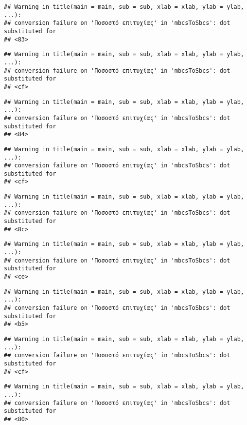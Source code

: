 \documentclass[
]{article}
\begin{document}
\begin{verbatim}
## Warning in title(main = main, sub = sub, xlab = xlab, ylab = ylab, ...):
## conversion failure on 'Ποσοστό επιτυχίας' in 'mbcsToSbcs': dot substituted for
## <83>
\end{verbatim}

\begin{verbatim}
## Warning in title(main = main, sub = sub, xlab = xlab, ylab = ylab, ...):
## conversion failure on 'Ποσοστό επιτυχίας' in 'mbcsToSbcs': dot substituted for
## <cf>
\end{verbatim}

\begin{verbatim}
## Warning in title(main = main, sub = sub, xlab = xlab, ylab = ylab, ...):
## conversion failure on 'Ποσοστό επιτυχίας' in 'mbcsToSbcs': dot substituted for
## <84>
\end{verbatim}

\begin{verbatim}
## Warning in title(main = main, sub = sub, xlab = xlab, ylab = ylab, ...):
## conversion failure on 'Ποσοστό επιτυχίας' in 'mbcsToSbcs': dot substituted for
## <cf>
\end{verbatim}

\begin{verbatim}
## Warning in title(main = main, sub = sub, xlab = xlab, ylab = ylab, ...):
## conversion failure on 'Ποσοστό επιτυχίας' in 'mbcsToSbcs': dot substituted for
## <8c>
\end{verbatim}

\begin{verbatim}
## Warning in title(main = main, sub = sub, xlab = xlab, ylab = ylab, ...):
## conversion failure on 'Ποσοστό επιτυχίας' in 'mbcsToSbcs': dot substituted for
## <ce>
\end{verbatim}

\begin{verbatim}
## Warning in title(main = main, sub = sub, xlab = xlab, ylab = ylab, ...):
## conversion failure on 'Ποσοστό επιτυχίας' in 'mbcsToSbcs': dot substituted for
## <b5>
\end{verbatim}

\begin{verbatim}
## Warning in title(main = main, sub = sub, xlab = xlab, ylab = ylab, ...):
## conversion failure on 'Ποσοστό επιτυχίας' in 'mbcsToSbcs': dot substituted for
## <cf>
\end{verbatim}

\begin{verbatim}
## Warning in title(main = main, sub = sub, xlab = xlab, ylab = ylab, ...):
## conversion failure on 'Ποσοστό επιτυχίας' in 'mbcsToSbcs': dot substituted for
## <80>
\end{verbatim}
\end{document}
